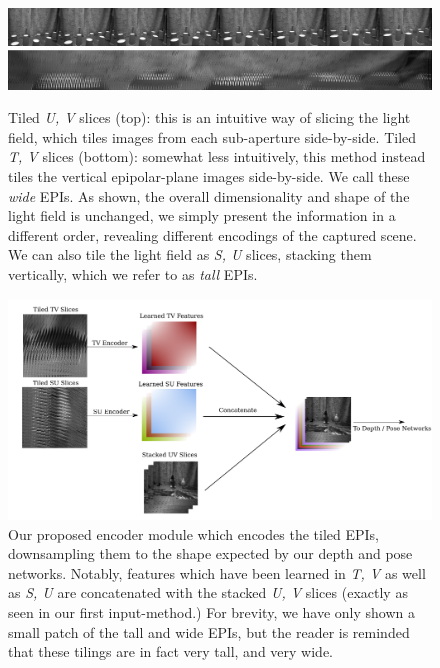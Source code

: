 \begin{figure}[h]
    \centering 
    \includegraphics[width=6in]{images/epitile_3.png}
    \includegraphics[width=6in]{images/epitile_2.png}
    \caption{Tiled \textit{U, V} slices (top): this is an intuitive way of slicing the light field, which tiles images from each sub-aperture side-by-side. Tiled \textit{T, V} slices (bottom): somewhat less intuitively, this method instead tiles the vertical epipolar-plane images side-by-side. We call these \textit{wide} EPIs. As shown, the overall dimensionality and shape of the light field is unchanged, we simply present the information in a different order, revealing different encodings of the captured scene. We can also tile the light field as \textit{S, U} slices, stacking them vertically, which we refer to as \textit{tall} EPIs.}
\end{figure}

\begin{figure}[H]
    \centering 
    \includegraphics[width=6in]{images/encoderpipe.png}
    \caption{Our proposed encoder module which encodes the tiled EPIs, downsampling them to the shape expected by our depth and pose networks. Notably, features which have been learned in \textit{T, V} as well as \textit{S, U} are concatenated with the stacked \textit{U, V} slices (exactly as seen in our first input-method.) For brevity, we have only shown a small patch of the tall and wide EPIs, but the reader is reminded that these tilings are in fact very tall, and very wide.}
\end{figure}


